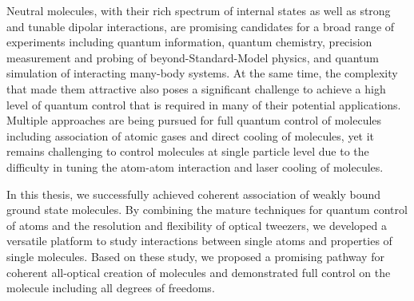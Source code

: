 
Neutral molecules, with their rich spectrum of internal states as well as
strong and tunable dipolar interactions, are promising candidates for
a broad range of experiments including quantum information,
quantum chemistry, precision measurement and probing of beyond-Standard-Model physics,
and quantum simulation of interacting many-body systems.
At the same time, the complexity that made them attractive also poses a significant challenge
to achieve a high level of quantum control that is required in many of
their potential applications.
Multiple approaches are being pursued for full quantum control of molecules
including association of atomic gases and direct cooling of molecules,
yet it remains challenging to control molecules at single particle level
due to the difficulty in tuning the atom-atom interaction
and laser cooling of molecules.

In this thesis, we successfully achieved coherent association of
weakly bound ground state molecules.
By combining the mature techniques for quantum control of atoms
and the resolution and flexibility of optical tweezers,
we developed a versatile platform to study interactions between single atoms
and properties of single molecules.
Based on these study, we proposed a promising pathway
for coherent all-optical creation of molecules
and demonstrated full control on the molecule including all degrees of freedoms.
